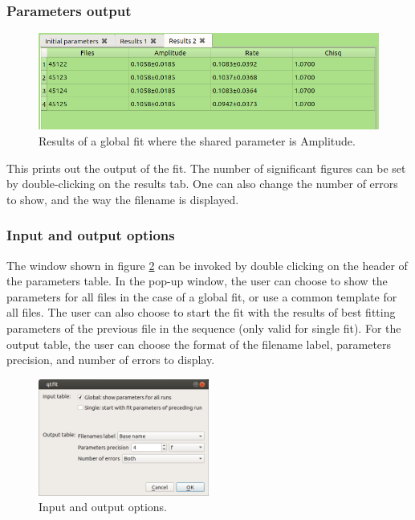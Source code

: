 \documentclass[10pt,letterpaper,oneside]{article}
\begin{document}
\subsubsection*{Parameters output}
\begin{figure}[!htb]
\center
\includegraphics[width=.9\textwidth]{analyze-res-g.png}
 \caption{Results of a global fit where the shared parameter is Amplitude.}
 \label{fig-tables}
 \end{figure}
This prints out the output of the fit. The number of significant figures can be set by double-clicking on the results tab. One can also change the number of errors to show, and the way the filename is displayed.

\subsubsection*{Input and output options}
The window shown in figure \ref{fig-top} can be invoked by double clicking on the 
header of the parameters table. In the pop-up window, the 
user can choose to show the parameters for all files in the case of a global fit, or 
use a common template for all files. The user can also choose to start the fit with the results of
best fitting parameters of the previous file in the sequence (only valid for single fit).
For the output table, the user can choose the format of the filename label,
parameters precision, and number of errors to display. 
\begin{figure}[!htb]
\center
\includegraphics[width=0.5\textwidth]{tableoptions.png}
 \caption{Input and output options.}
 \label{fig-top}
 \end{figure}
\end{document}
